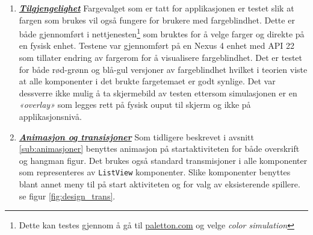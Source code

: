 \begin{enumerate}
\item \textbf{\textsl{\href{https://www.google.com/design/spec/usability/accessibility.html}{Tilgjengelighet}}}
Fargevalget som er tatt for applikasjonen er testet slik at fargen som brukes vil også fungere for brukere med fargeblindhet. Dette er både gjennomført i nettjenesten\footnote{Dette kan testes gjennom å gå til \href{http://paletton.com/\#uid=3470u0krausgVEBm0wFuzpjybk1}{paletton.com} og velge \textit{color simulation}} som bruktes for å velge farger og direkte på en fysisk enhet. Testene var gjennomført på en Nexus 4 enhet med API 22 som tillater endring av fargerom for å visualisere fargeblindhet. Det er testet for både rød-grønn og blå-gul versjoner av fargeblindhet hvilket i teorien viste at alle komponenter i det brukte fargetemaet er godt synlige. Det var dessverre ikke mulig å ta skjermebild av testen ettersom simulasjonen er en \textit{«overlay»} som legges rett på fysisk ouput til skjerm og ikke på applikasjonsnivå. 

\item \textbf{\textsl{\href{https://www.google.com/design/spec/animation/authentic-motion.html}{Animasjon og transisjoner}}}
Som tidligere beskrevet i avsnitt \ref{sub:animasjoner} benyttes animasjon på startaktiviteten for både overskrift og hangman figur. Det brukes også standard transmisjoner i alle komponenter som representeres av \texttt{ListView} komponenter. Slike komponenter benyttes blant annet meny til på start aktiviteten og for valg av eksisterende spillere. se figur \ref{fig:design_trans}.


\end{enumerate}
